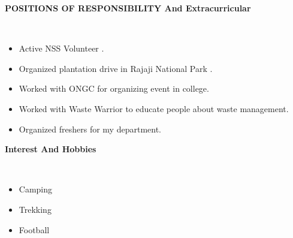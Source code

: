 \documentclass[a4paper,10pt]{article}
\newcommand{\lsep}{-0.5cm}
\newcommand{\resheading}[1]{{\small \colorbox{mygrey}{\begin{minipage}{0.975\textwidth}{\textbf{#1 \vphantom{p\^{E}}}}\end{minipage}}}}
\begin{document}
\resheading{\textbf{POSITIONS OF RESPONSIBILITY And Extracurricular} }\\[\lsep]
\begin{itemize}
\setlength\itemsep{0em}
\item \noindent  Active NSS Volunteer .
\item \noindent Organized plantation drive in Rajaji National Park .
\item \noindent  Worked with ONGC for organizing event in college.
\item \noindent Worked with Waste Warrior to educate people about waste management.
\item \noindent Organized freshers for my department.
\end{itemize}

\resheading{\textbf{Interest And Hobbies} }\\[\lsep]
\begin{itemize}
\setlength\itemsep{0em}
\item \noindent Camping  \item Trekking \item Football  
\end{itemize}
\end{document}
